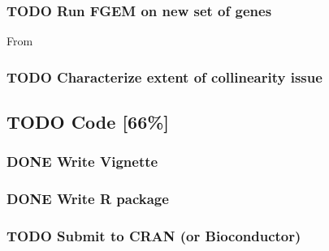 \documentclass[11pt]{article}
\begin{document}
\subsubsection*{{\bfseries\sffamily TODO} Run FGEM on new set of genes}
\label{sec:org49ed5db}
From \cite{satterstrom}
\subsubsection*{{\bfseries\sffamily TODO} Characterize extent of collinearity issue}
\label{sec:org27d105a}
\subsection*{{\bfseries\sffamily TODO} Code [66\%]}
\label{sec:org1d6eb4c}
\subsubsection*{{\bfseries\sffamily DONE} Write Vignette}
\label{sec:org3ceb1fa}
\subsubsection*{{\bfseries\sffamily DONE} Write R package}
\label{sec:org802189f}
\subsubsection*{{\bfseries\sffamily TODO} Submit to CRAN (or Bioconductor)}
\label{sec:org98dad4f}
\end{document}
